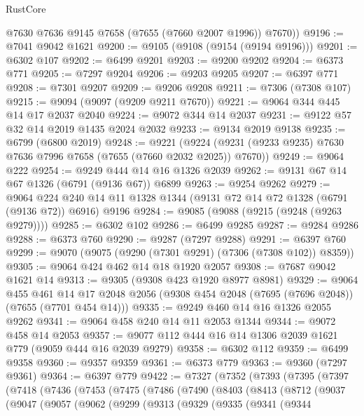 \begin{lexlean}{RustCore}
\begin{coremodule}
        @7630
        @7636
        @9145
        @7658
        (@7655 (@7660 @2007 @1996))
        @7670))
@9196 := @7041 @9042 @1621
@9200 := @9105 (@9108 (@9154 (@9194 @9196)))
@9201 := @6302 @107
@9202 := @6499 @9201
@9203 := @9200 @9202
@9204 := @6373 @771
@9205 := @7297 @9204
@9206 := @9203 @9205
@9207 := @6397 @771
@9208 := @7301 @9207
@9209 := @9206 @9208
@9211 := @7306 (@7308 @107)
@9215 := @9094 (@9097 (@9209 @9211 @7670))
@9221 := @9064 @344 @445 @14 @17 @2037 @2040
@9224 := @9072 @344 @14 @2037
@9231 := @9122 @57 @32 @14 @2019 @1435 @2024 @2032
@9233 := @9134 @2019 @9138
@9235 := @6799 (@6800 @2019)
@9248 := @9221
    (@9224 (@9231 (@9233 @9235) @7630 @7636 @7996 @7658 (@7655 (@7660 @2032 @2025)) @7670))
@9249 := @9064 @222
@9254 := @9249 @444 @14 @16 @1326 @2039
@9262 := @9131 @67 @14 @67 @1326 (@6791 (@9136 @67)) @6899
@9263 := @9254 @9262
@9279 := @9064
    @224
    @240
    @14
    @11
    @1328
    @1344
    (@9131 @72 @14 @72 @1328 (@6791 (@9136 @72)) @6916)
    @9196
@9284 := @9085 (@9088 (@9215 (@9248 (@9263 @9279))))
@9285 := @6302 @102
@9286 := @6499 @9285
@9287 := @9284 @9286
@9288 := @6373 @760
@9290 := @9287 (@7297 @9288)
@9291 := @6397 @760
@9299 := @9070 (@9075 (@9290 (@7301 @9291) (@7306 (@7308 @102)) @8359))
@9305 := @9064 @424 @462 @14 @18 @1920 @2057
@9308 := @7687 @9042 @1621 @14
@9313 := @9305 (@9308 @423 @1920 @8977 @8981)
@9329 := @9064
    @455
    @461
    @14
    @17
    @2048
    @2056
    (@9308 @454 @2048 (@7695 (@7696 @2048)) (@7655 (@7701 @454 @14)))
@9335 := @9249 @460 @14 @16 @1326 @2055 @9262
@9341 := @9064 @458 @240 @14 @11 @2053 @1344
@9344 := @9072 @458 @14 @2053
@9357 := @9077 @112 @444 @16 @14 @1306 @2039 @1621 @779 (@9059 @444 @16 @2039 @9279)
@9358 := @6302 @112
@9359 := @6499 @9358
@9360 := @9357 @9359
@9361 := @6373 @779
@9363 := @9360 (@7297 @9361)
@9364 := @6397 @779
@9422 := @7327
    (@7352
      (@7393
        (@7395
          (@7397
            (@7418
              (@7436
                (@7453
                  (@7475
                    (@7486
                      (@7490
                        (@8403
                          (@8413
                            (@8712
                              (@9037
                                (@9047
                                  (@9057
                                    (@9062
                                      (@9299
                                        (@9313
                                          (@9329
                                            (@9335
                                              (@9341
                                                (@9344

\end{coremodule}
\end{lexlean}
